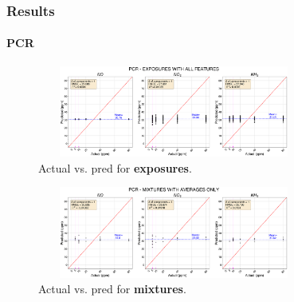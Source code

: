 \documentclass{beamer}
\begin{document}
\begin{frame}
	\frametitle{Results}
	\framesubtitle{PCR}

		
		\begin{figure}
			\includegraphics[width=0.8\textwidth, height = 3cm, keepaspectratio]{../../figures/pcr-act-vs-pred.png}
			\caption{Actual vs. pred for \textbf{exposures}.}
			\label{fig:pcr-act-vs-pred} 
		\end{figure}
		
		\begin{figure}
			\includegraphics[width=0.8\textwidth, height = 3cm, keepaspectratio]{../../figures/pcr-act-vs-pred-avg-feat.png}
			\caption{Actual vs. pred for \textbf{mixtures}.}
			\label{fig:pcr-act-vs-pred-avg-feat}
		\end{figure}

\end{frame}
\end{document}
